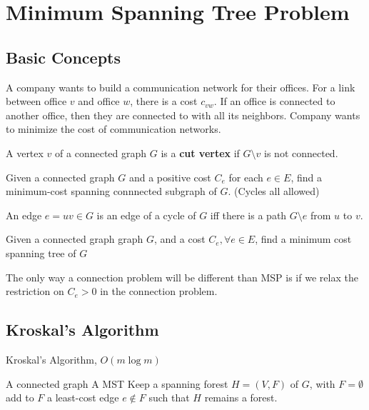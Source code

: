 	\chapter{Minimum Spanning Tree Problem}
		\section{Basic Concepts}
			\begin{example}
				A company wants to build a communication network for their offices. For a link between office $v$ and office $w$, there is a cost $c_{vw}$. If an office is connected to another office, then they are connected to with all its neighbors. Company wants to minimize the cost of communication networks.
			\end{example}

			\begin{definition}
				A vertex $v$ of a connected graph $G$ is a \textbf{cut vertex} if $G\setminus v$ is not connected.
			\end{definition}

			\begin{definition}
				Given a connected graph $G$ and a positive cost $C_e$ for each $e\in E$, find a minimum-cost spanning connnected subgraph of $G$. (Cycles all allowed)
			\end{definition}

			\begin{lemma}
				An edge $e = uv \in G$ is an edge of a cycle of $G$ iff there is a path $G\setminus e$ from $u$ to $v$.
			\end{lemma}

			\begin{definition}
				Given a connected graph graph $G$, and a cost $C_e, \forall e\in E$, find a minimum cost spanning tree of $G$
			\end{definition}

			The only way a connection problem will be different than MSP is if we relax the restriction on $C_e > 0$ in the connection problem.

		\section{Kroskal's Algorithm}
			\begin{algorithm}
				\caption{Kroskal's Algorithm, $O(m \log m)$}
				\begin{algorithmic}
					\Require A connected graph
					\Ensure A MST
					\State Keep a spanning forest $H=(V, F)$ of $G$, with $F=\emptyset$
						\State add to $F$ a least-cost edge $e\notin F$ such that $H$ remains a forest.
					\EndWhile
				\end{algorithmic}
			\end{algorithm}

